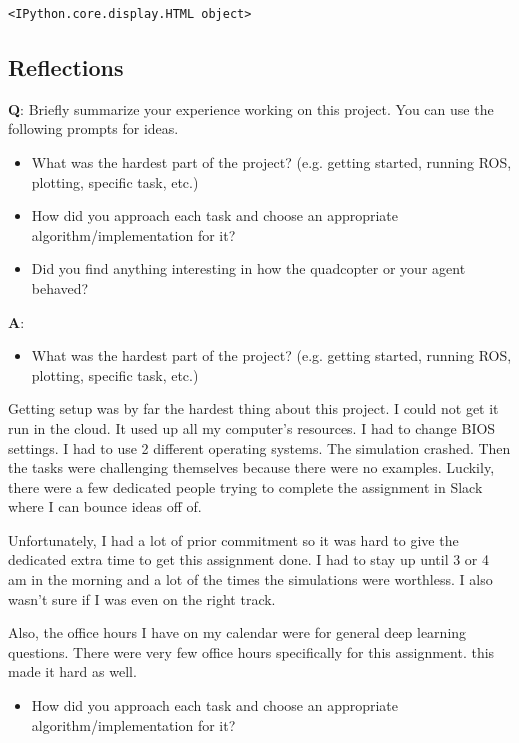 \documentclass[11pt]{article}
\providecommand{\tightlist}{%
      \setlength{\itemsep}{0pt}\setlength{\parskip}{0pt}}
\begin{document}
    
    \begin{verbatim}
<IPython.core.display.HTML object>
    \end{verbatim}

    
    \subsection{Reflections}\label{reflections}

\textbf{Q}: Briefly summarize your experience working on this project.
You can use the following prompts for ideas.

\begin{itemize}
\tightlist
\item
  What was the hardest part of the project? (e.g. getting started,
  running ROS, plotting, specific task, etc.)
\item
  How did you approach each task and choose an appropriate
  algorithm/implementation for it?
\item
  Did you find anything interesting in how the quadcopter or your agent
  behaved?
\end{itemize}

\textbf{A}:

\begin{itemize}
\tightlist
\item
  What was the hardest part of the project? (e.g. getting started,
  running ROS, plotting, specific task, etc.)
\end{itemize}

Getting setup was by far the hardest thing about this project. I could
not get it run in the cloud. It used up all my computer's resources. I
had to change BIOS settings. I had to use 2 different operating systems.
The simulation crashed. Then the tasks were challenging themselves
because there were no examples. Luckily, there were a few dedicated
people trying to complete the assignment in Slack where I can bounce
ideas off of.

Unfortunately, I had a lot of prior commitment so it was hard to give
the dedicated extra time to get this assignment done. I had to stay up
until 3 or 4 am in the morning and a lot of the times the simulations
were worthless. I also wasn't sure if I was even on the right track.

Also, the office hours I have on my calendar were for general deep
learning questions. There were very few office hours specifically for
this assignment. this made it hard as well.

\begin{itemize}
\tightlist
\item
  How did you approach each task and choose an appropriate
  algorithm/implementation for it?
\end{itemize}
\end{document}
